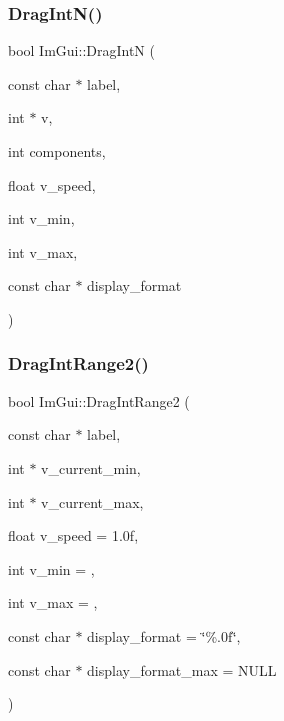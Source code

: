\mbox{\label{namespace_im_gui_a2854d672b818938e6e9fb1de6de3dbe7}} 
\subsubsection{\texorpdfstring{Drag\+Int\+N()}{DragIntN()}}
{\footnotesize\ttfamily bool Im\+Gui\+::\+Drag\+IntN (\begin{DoxyParamCaption}\item[{const char $\ast$}]{label,  }\item[{int $\ast$}]{v,  }\item[{int}]{components,  }\item[{float}]{v\+\_\+speed,  }\item[{int}]{v\+\_\+min,  }\item[{int}]{v\+\_\+max,  }\item[{const char $\ast$}]{display\+\_\+format }\end{DoxyParamCaption})}

\mbox{\label{namespace_im_gui_a6aaacf92126bf45ce0e58348b5297a43}} 
\subsubsection{\texorpdfstring{Drag\+Int\+Range2()}{DragIntRange2()}}
{\footnotesize\ttfamily bool Im\+Gui\+::\+Drag\+Int\+Range2 (\begin{DoxyParamCaption}\item[{const char $\ast$}]{label,  }\item[{int $\ast$}]{v\+\_\+current\+\_\+min,  }\item[{int $\ast$}]{v\+\_\+current\+\_\+max,  }\item[{float}]{v\+\_\+speed = {\ttfamily 1.0f},  }\item[{int}]{v\+\_\+min = {},  }\item[{int}]{v\+\_\+max = {},  }\item[{const char $\ast$}]{display\+\_\+format = {\ttfamily \char`\"{}\%.0f\char`\"{}},  }\item[{const char $\ast$}]{display\+\_\+format\+\_\+max = {\ttfamily NULL} }\end{DoxyParamCaption})}

